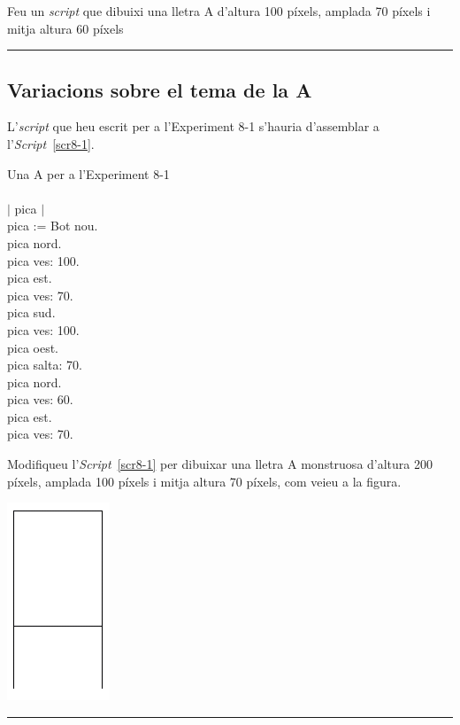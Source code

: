 \begin{center}
\colorbox{black}{}
\end{center}
{\small
\noindent
Feu un \emph{script} que dibuixi una lletra A d'altura 100 píxels, amplada 70 píxels i mitja altura 60 píxels}\\
\noindent
\rule{\textwidth}{3pt}

\subsection{Variacions sobre el tema de la A}

L'\emph{script} que heu escrit per a l'Experiment 8-1 s'hauria d'assemblar a l'\emph{Script}~\ref{scr8-1}.

\begin{script}  Una A per a l'Experiment 8-1
\textsf{\upshape
\\
\\$|$ pica $|$\\
pica := Bot nou.\\
pica nord.\\
pica ves: 100.\\
pica est.\\
pica ves: 70.\\
pica sud.\\
pica ves: 100.\\
pica oest.\\
pica salta: 70.\\
pica nord.\\
pica ves: 60.\\
pica est.\\
pica ves: 70.\\
}
\label{scr8-1}
\end{script}

\begin{center}
\colorbox{black}{}
\end{center}
{\small
\noindent
Modifiqueu l'\emph{Script}~\ref{scr8-1} per dibuixar una lletra A monstruosa d'altura 200 píxels, amplada 100 píxels i mitja altura 70 píxels, com veieu a la figura.}
\begin{center}
\includegraphics[scale=3.0]{Imatges/figuraE8-2.png}
\end{center}
\noindent
\rule{\textwidth}{3pt}
\vspace{3mm}

